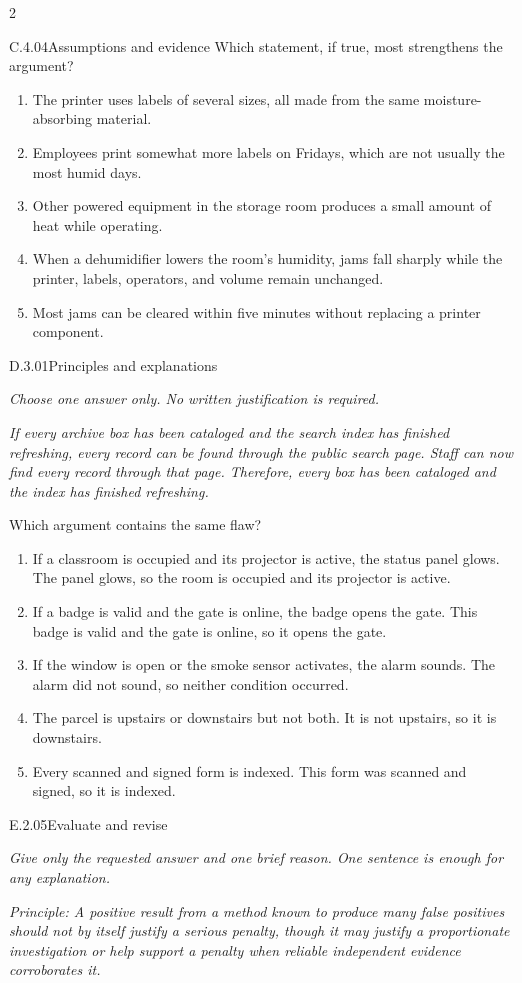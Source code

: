 \documentclass[9pt]{extarticle}
\newcommand{\choice}[1]{\item #1}
\begin{document}
\begin{multicols}{2}
\begin{DenseCoreProblem}{C.4.04}{Assumptions and evidence}
Which statement, if true, most strengthens the argument?
\begin{enumerate}[label=(\alph*)]
  \choice{The printer uses labels of several sizes, all made from the same moisture-absorbing material.}
  \choice{Employees print somewhat more labels on Fridays, which are not usually the most humid days.}
  \choice{Other powered equipment in the storage room produces a small amount of heat while operating.}
  \choice{When a dehumidifier lowers the room's humidity, jams fall sharply while the printer, labels, operators, and volume remain unchanged.}
  \choice{Most jams can be cleared within five minutes without replacing a printer component.}
\end{enumerate}
\end{DenseCoreProblem}
\begin{DenseCoreProblem}{D.3.01}{Principles and explanations}
{\scriptsize\textit{Choose one answer only. No written justification is required.}\par}
\emph{If every archive box has been cataloged and the search index has finished refreshing, every record can be found through the public search page. Staff can now find every record through that page. Therefore, every box has been cataloged and the index has finished refreshing.}

Which argument contains the same flaw?
\begin{enumerate}[label=(\alph*)]
  \choice{If a classroom is occupied and its projector is active, the status panel glows. The panel glows, so the room is occupied and its projector is active.}
  \choice{If a badge is valid and the gate is online, the badge opens the gate. This badge is valid and the gate is online, so it opens the gate.}
  \choice{If the window is open or the smoke sensor activates, the alarm sounds. The alarm did not sound, so neither condition occurred.}
  \choice{The parcel is upstairs or downstairs but not both. It is not upstairs, so it is downstairs.}
  \choice{Every scanned and signed form is indexed. This form was scanned and signed, so it is indexed.}
\end{enumerate}
\end{DenseCoreProblem}
\begin{DenseCoreProblem}{E.2.05}{Evaluate and revise}
{\scriptsize\textit{Give only the requested answer and one brief reason. One sentence is enough for any explanation.}\par}
\emph{Principle: A positive result from a method known to produce many false positives should not by itself justify a serious penalty, though it may justify a proportionate investigation or help support a penalty when reliable independent evidence corroborates it.}


\end{DenseCoreProblem}
\end{multicols}
\end{document}
